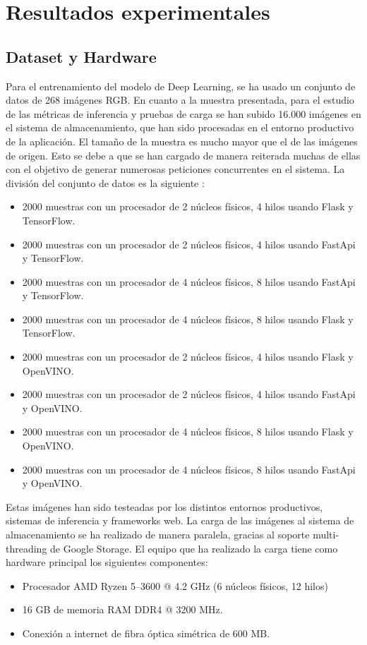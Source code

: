 \mbox{}


\chapter{Resultados experimentales}
\label{ch:chapte5}


\section{Dataset y Hardware}\label{sec:dataset-usado}
Para el entrenamiento del modelo de Deep Learning, se ha usado un conjunto de datos de 268 imágenes RGB\@.
En cuanto a la muestra presentada, para el estudio de las métricas de inferencia y pruebas de carga se han subido 16.000 imágenes en el sistema de almacenamiento, que han sido procesadas en el entorno productivo de la aplicación.
El tamaño de la muestra es mucho mayor que el de las imágenes de origen.
Esto se debe a que se han cargado de manera reiterada muchas de ellas con el objetivo de generar numerosas peticiones concurrentes en el sistema. La división del conjunto de datos es la siguiente :
\begin{itemize}
    \item 2000 muestras con un procesador de 2 núcleos físicos, 4 hilos usando Flask y TensorFlow.
    \item 2000 muestras con un procesador de 2 núcleos físicos, 4 hilos usando FastApi y TensorFlow.
    \item 2000 muestras con un procesador de 4 núcleos físicos, 8 hilos usando FastApi y TensorFlow.
    \item 2000 muestras con un procesador de 4 núcleos físicos, 8 hilos usando Flask y TensorFlow.
    \item 2000 muestras con un procesador de 2 núcleos físicos, 4 hilos usando Flask y OpenVINO\@.
    \item 2000 muestras con un procesador de 2 núcleos físicos, 4 hilos usando FastApi y OpenVINO\@.
    \item 2000 muestras con un procesador de 4 núcleos físicos, 8 hilos usando Flask y OpenVINO\@.
    \item 2000 muestras con un procesador de 4 núcleos físicos, 8 hilos usando FastApi y OpenVINO\@.
\end{itemize}

Estas imágenes han sido testeadas por los distintos entornos productivos, sistemas de inferencia y frameworks web.
La carga de las imágenes al sistema de almacenamiento se ha realizado de manera paralela, gracias al soporte multi-threading de Google Storage.
El equipo que ha realizado la carga tiene como hardware principal los siguientes componentes:
\begin{itemize}
    \item Procesador AMD Ryzen 5--3600 @ 4.2 GHz (6 núcleos físicos, 12 hilos)
    \item 16 GB de memoria RAM DDR4 @ 3200 MHz.
    \item Conexión a internet de fibra óptica simétrica de 600 MB\@.
\end{itemize}

